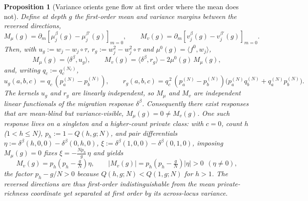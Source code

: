 \documentclass[11pt]{article}
\theoremstyle{plain}
\newtheorem{prop}[thm]{Proposition}
\theoremstyle{definition}
\theoremstyle{remark}
\begin{document}
\begin{prop}[Variance orients gene flow at first order where the mean does not]
\label{prop:variance-orients}
Define at depth $g$ the first-order mean and variance \emph{margins} between the reversed
directions,
\[
M_\mu(g)=\partial_m\!\left[\mu_j^{\beta}(g)-\mu_j^{\beta'}(g)\right]_{m=0},\qquad
M_v(g)=\partial_m\!\left[v_j^{\beta}(g)-v_j^{\beta'}(g)\right]_{m=0}.
\]
Then, with $u_g:=w_j-w_j\!\circ\!\tau$, $r_g:=w_j^2-w_j^2\!\circ\!\tau$ and
$\mu^0(g)=\langle f^0,w_j\rangle$,
\[
M_\mu(g)=\langle\delta^{\beta},u_g\rangle,\qquad
M_v(g)=\langle\delta^{\beta},r_g\rangle-2\mu^0(g)\,M_\mu(g),
\]
and, writing $q_c:=q^{(N_\ell)}_c$,
\[
u_g(a,b,c)=q_c\,(p^{(N)}_a-p^{(N)}_b),\qquad
r_g(a,b,c)=q_c^{\,2}\,(p^{(N)}_a-p^{(N)}_b)\big(p^{(N)}_a q^{(N)}_b+q^{(N)}_a p^{(N)}_b\big).
\]
The kernels $u_g$ and $r_g$ are linearly independent, so $M_\mu$ and $M_v$ are independent
linear functionals of the migration response $\delta^\beta$. Consequently there exist responses
that are mean-blind but variance-visible, $M_\mu(g)=0\neq M_v(g)$. One such response lives on a
singleton and a higher-count private class: with $c=0$, count $h$ ($1<h\le N$),
$p_h:=1-Q(h,g;N)$, and pair differentials
$\eta:=\delta^\beta(h,0,0)-\delta^\beta(0,h,0)$,
$\xi:=\delta^\beta(1,0,0)-\delta^\beta(0,1,0)$, imposing $M_\mu(g)=0$ fixes
$\xi=-\tfrac{Np_h}{g}\,\eta$ and yields
\[
M_v(g)=p_h\!\left(p_h-\tfrac{g}{N}\right)\eta,\qquad
\big|M_v(g)\big|=p_h\!\left(p_h-\tfrac{g}{N}\right)|\eta|>0\ \ (\eta\neq0),
\]
the factor $p_h-g/N>0$ because $Q(h,g;N)<Q(1,g;N)$ for $h>1$. The reversed directions are thus
first-order indistinguishable from the mean private-richness coordinate yet separated at first
order by its across-locus variance.
\end{prop}
\end{document}
